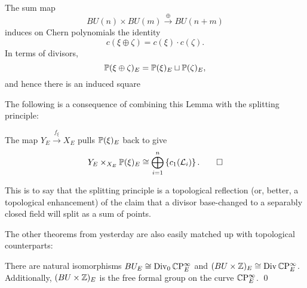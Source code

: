 \begin{lemma}\label{WhitneySumOfDivisors}
The sum map \[BU(n) \times BU(m) \xrightarrow\oplus BU(n+m)\] induces on Chern polynomials the identity \[c(\xi \oplus \zeta) = c(\xi) \cdot c(\zeta).\]  In terms of divisors, \[\P(\xi \oplus \zeta)_E = \P(\xi)_E \sqcup \P(\zeta)_E,\] and hence there is an induced square
\begin{center}
\end{center}
\end{lemma}

The following is a consequence of combining this Lemma with the splitting principle:

\begin{corollary}
The map $Y_E \xrightarrow{f_\xi} X_E$ pulls $\P(\xi)_E$ back to give \[Y_E \times_{X_E} \P(\xi)_E \cong \bigoplus_{i=1}^n \left\{ c_1(\L_i) \right\}. \qed\]
\end{corollary}

\noindent This is to say that the splitting principle is a topological reflection (or, better, a topological enhancement) of the claim that a divisor base-changed to a separably closed field will split as a sum of points.

The other theorems from yesterday are also easily matched up with topological counterparts:

\begin{corollary}
There are natural isomorphisms $BU_E \cong \Div_0 \CP^\infty_E$ and $(BU \times \Z)_E \cong \Div \CP^\infty_E$. Additionally, $(BU \times \Z)_E$ is the free formal group on the curve $\CP^\infty_E$. \qed
\end{corollary}

